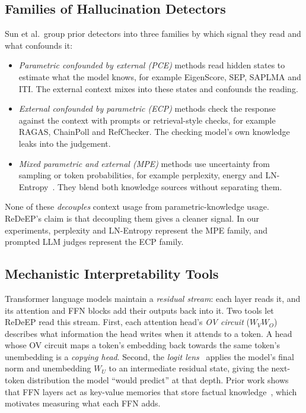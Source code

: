 \documentclass[conference]{IEEEtran}
\begin{document}
\subsection{Families of Hallucination Detectors}
Sun et al.\ group prior detectors into three families by which signal they read and what confounds it:
\begin{itemize}
\item \emph{Parametric confounded by external (PCE)} methods read hidden states to estimate what the model knows, for example EigenScore, SEP, SAPLMA and ITI. The external context mixes into these states and confounds the reading.
\item \emph{External confounded by parametric (ECP)} methods check the response against the context with prompts or retrieval-style checks, for example RAGAS, ChainPoll and RefChecker. The checking model's own knowledge leaks into the judgement.
\item \emph{Mixed parametric and external (MPE)} methods use uncertainty from sampling or token probabilities, for example perplexity, energy and LN-Entropy~\cite{malinin2021uncertainty}. They blend both knowledge sources without separating them.
\end{itemize}
None of these \emph{decouples} context usage from parametric-knowledge usage. ReDeEP's claim is that decoupling them gives a cleaner signal. In our experiments, perplexity and LN-Entropy represent the MPE family, and prompted LLM judges represent the ECP family.

\subsection{Mechanistic Interpretability Tools}
Transformer language models maintain a \emph{residual stream}: each layer reads it, and its attention and FFN blocks add their outputs back into it. Two tools let ReDeEP read this stream. First, each attention head's \emph{OV circuit} ($W_V W_O$) describes what information the head writes when it attends to a token. A head whose OV circuit maps a token's embedding back towards the same token's unembedding is a \emph{copying head}. Second, the \emph{logit lens}~\cite{logitlens} applies the model's final norm and unembedding $W_U$ to an intermediate residual state, giving the next-token distribution the model ``would predict'' at that depth. Prior work shows that FFN layers act as key-value memories that store factual knowledge~\cite{geva2021ffn}, which motivates measuring what each FFN adds.
\end{document}
